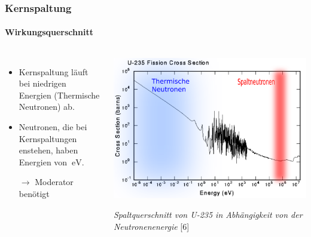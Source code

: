 \documentclass{beamer}[9pt]
\begin{document}
\begin{frame}
\frametitle{Kernspaltung}
\framesubtitle{Wirkungsquerschnitt}
\begin{columns}
\begin{itemize}
\item Kernspaltung läuft bei niedrigen Energien (Thermische Neutronen) ab.
\item Neutronen, die bei Kernspaltungen enstehen, haben Energien von $\SI{}{\eV}$.
\item [$\rightarrow$] Moderator benötigt
\end{itemize}
\begin{center}
\vspace{-.6cm}
\includegraphics[scale=0.35]{u235_fission_cs.pdf}

\textit{Spaltquerschnitt von U-235 in Abhängigkeit von der Neutronenenergie} [6]

\end{center}
\end{columns}
\end{frame}
\end{document}
